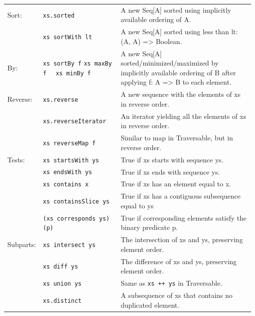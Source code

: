 \documentclass[article, a5paper]{memoir}
\begin{document}
{\begin{tabular}{@{}l p{3.75cm} p{6.8cm}}
  Sort: & \texttt{xs.sorted} & A new Seq[A] sorted using implicitly available ordering of A. \\   \cline{2-3}
   & \texttt{xs sortWith lt} &  	A new Seq[A] sorted using less than lt: (A, A) => Boolean.\\\cline{2-3}
By:  & \texttt{xs sortBy f} \newline \texttt{xs maxBy f} \texttt{~~xs minBy f}  &  	A new Seq[A] sorted/minimized/maximized by implicitly available ordering of B after applying f: A => B to each element.\\ \cline{1-3}
        

  Reverse: & \texttt{xs.reverse} & A new sequence with the elements of xs in reverse order. \\   \cline{2-3}
   & \texttt{xs.reverseIterator} & An iterator yielding all the elements of xs in reverse order.\\\cline{2-3}
   & \texttt{xs reverseMap f} & Similar to map in Traversable, but in reverse order.\\\cline{1-3}
        

  Tests: & \texttt{xs startsWith ys} & True if xs starts with sequence ys. \\   \cline{2-3}
   & \texttt{xs endsWith ys} & True if xs ends with sequence ys.\\\cline{2-3}
   & \texttt{xs contains x} & True if xs has an element equal to x.\\\cline{2-3}
   & \texttt{xs containsSlice ys} & True if xs has a contiguous subsequence equal to ys\\\cline{2-3}
   & \texttt{(xs corresponds ys)(p)} & True if corresponding elements satisfy the binary predicate p.\\\cline{1-3}
   
  Subparts: & \texttt{xs intersect ys} & The intersection of xs and ys, preserving element order.\\\cline{2-3}
   & \texttt{xs diff ys} & The difference of xs and ys, preserving element order.\\\cline{2-3}
   & \texttt{xs union ys} & Same as \texttt{xs ++ ys} in Traversable.\\\cline{2-3}
   & \texttt{xs.distinct} & A subsequence of xs that contains no duplicated element.\\\cline{1-3}
                   
       
        
\end{tabular}
}  
\end{document}
